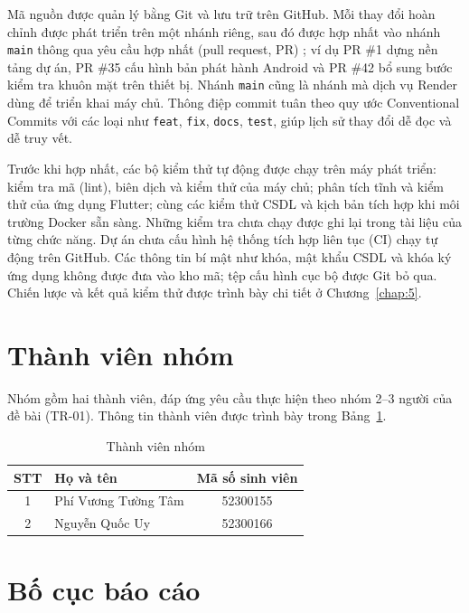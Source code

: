 Mã nguồn được quản lý bằng Git và lưu trữ trên GitHub. Mỗi thay đổi hoàn chỉnh được phát triển trên một nhánh riêng, sau đó được hợp nhất vào nhánh \texttt{main} thông qua yêu cầu hợp nhất (pull request, PR) \parencite{ch1-github-pr}; ví dụ PR \#1 dựng nền tảng dự án, PR \#35 cấu hình bản phát hành Android và PR \#42 bổ sung bước kiểm tra khuôn mặt trên thiết bị. Nhánh \texttt{main} cũng là nhánh mà dịch vụ Render dùng để triển khai máy chủ. Thông điệp commit tuân theo quy ước Conventional Commits \parencite{ch1-conventionalcommits} với các loại như \texttt{feat}, \texttt{fix}, \texttt{docs}, \texttt{test}, giúp lịch sử thay đổi dễ đọc và dễ truy vết.

Trước khi hợp nhất, các bộ kiểm thử tự động được chạy trên máy phát triển: kiểm tra mã (lint), biên dịch và kiểm thử của máy chủ; phân tích tĩnh và kiểm thử của ứng dụng Flutter; cùng các kiểm thử CSDL và kịch bản tích hợp khi môi trường Docker sẵn sàng. Những kiểm tra chưa chạy được ghi lại trong tài liệu của từng chức năng. Dự án chưa cấu hình hệ thống tích hợp liên tục (CI) chạy tự động trên GitHub. Các thông tin bí mật như khóa, mật khẩu CSDL và khóa ký ứng dụng không được đưa vào kho mã; tệp cấu hình cục bộ được Git bỏ qua. Chiến lược và kết quả kiểm thử được trình bày chi tiết ở Chương~\ref{chap:5}.

\section{Thành viên nhóm}
\label{sec:ch1-thanh-vien}

Nhóm gồm hai thành viên, đáp ứng yêu cầu thực hiện theo nhóm 2--3 người của đề bài (TR-01). Thông tin thành viên được trình bày trong Bảng~\ref{tab:ch1-thanh-vien}.

\begin{table}[H]
	\centering
	\caption{Thành viên nhóm}
	\label{tab:ch1-thanh-vien}
	\begin{tabular}{@{}c l c@{}}
		\toprule
		\textbf{STT} & \textbf{Họ và tên} & \textbf{Mã số sinh viên} \\
		\midrule
		1 & Phí Vương Tường Tâm & 52300155 \\
		2 & Nguyễn Quốc Uy & 52300166 \\
		\bottomrule
	\end{tabular}
\end{table}

\section{Bố cục báo cáo}
\label{sec:ch1-bo-cuc}

